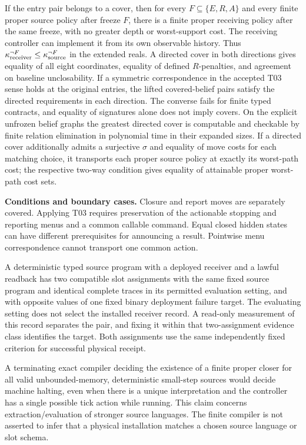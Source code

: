 \begin{theorem}
If the entry pair belongs to a cover, then for every \(F\subseteq\{E,R,A\}\) and every finite proper source policy after freeze \(F\), there is a finite proper receiving policy after the same freeze, with no greater depth or worst-support cost. The receiving controller can implement it from its own observable history. Thus \(\kappa_{\rm receiver}^{\neg F}\le\kappa_{\rm source}^{\neg F}\) in the extended reals. A directed cover in both directions gives equality of all eight coordinates, equality of defined \(R\)-penalties, and agreement on baseline unclosability. If a symmetric correspondence in the accepted T03 sense holds at the original entries, the lifted covered-belief pairs satisfy the directed requirements in each direction. The converse fails for finite typed contracts, and equality of signatures alone does not imply covers. On the explicit unfrozen belief graphs the greatest directed cover is computable and checkable by finite relation elimination in polynomial time in their expanded sizes. If a directed cover additionally admits a surjective \(\sigma\) and equality of move costs for each matching choice, it transports each proper source policy at exactly its worst-path cost; the respective two-way condition gives equality of attainable proper worst-path cost sets.

\textbf{Conditions and boundary cases.} Closure and report moves are separately covered. Applying T03 requires preservation of the actionable stopping and reporting menus and a common callable command. Equal closed hidden states can have different prerequisites for announcing a result. Pointwise menu correspondence cannot transport one common action.

\end{theorem}

\begin{theorem}\label{ext:m013}

A deterministic typed source program with a deployed receiver and a lawful readback has two compatible slot assignments with the same fixed source program and identical complete traces in its permitted evaluation setting, and with opposite values of one fixed binary deployment failure target. The evaluating setting does not select the installed receiver record. A read-only measurement of this record separates the pair, and fixing it within that two-assignment evidence class identifies the target. Both assignments use the same independently fixed criterion for successful physical receipt.

A terminating exact compiler deciding the existence of a finite proper closer for all valid unbounded-memory, deterministic small-step sources would decide machine halting, even when there is a unique interpretation and the controller has a single possible tick action while running. This claim concerns extraction/evaluation of stronger source languages. The finite compiler is not asserted to infer that a physical installation matches a chosen source language or slot schema.

\end{theorem}


